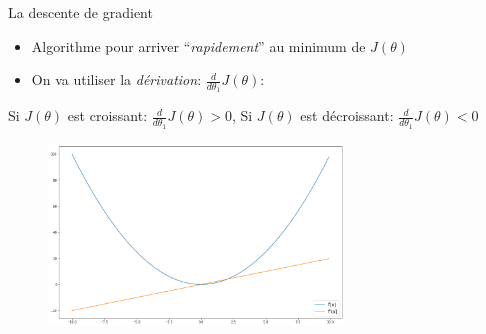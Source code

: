\documentclass[11pt]{beamer}
\begin{document}
\begin{frame}{La descente de gradient}
  \begin{itemize}
  \item Algorithme pour arriver ``\textit{rapidement}'' au minimum de $J(\theta)$ 
    \vspace{0.2cm}
  \item On va utiliser la \textit{dérivation}: $\frac{d}{d\theta_{1}}J(\theta)$:
  \end{itemize}
  \begin{center}
    Si $J(\theta)$ est croissant: $\frac{d}{d\theta_{1}}J(\theta) > 0$, \hspace{0.5cm}
    Si $J(\theta)$ est décroissant: $\frac{d}{d\theta_{1}}J(\theta) < 0$
  \end{center}
  \vspace{-0.5cm}
  \begin{figure}
    \includegraphics[width=0.7\textwidth]{figs/derivation.png}
  \end{figure}
  \vspace{-0.5cm}
\end{frame}
\end{document}
